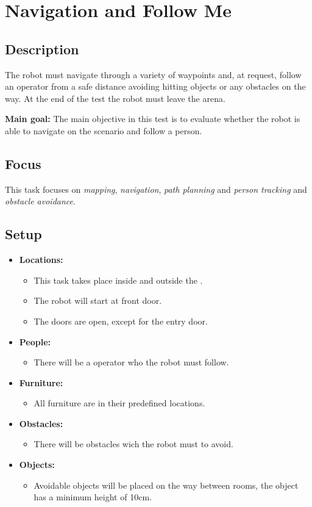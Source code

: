 \section{Navigation and Follow Me}
\label{test:navigation-and-follow-me}

\subsection*{Description}
The robot must navigate through a variety of waypoints and, at request, follow an operator from a safe distance avoiding hitting objects or any obstacles on the way. At the end of the test the robot must leave the arena.

\noindent \textbf{Main goal:}
The main objective in this test is to evaluate whether the robot is able to navigate on the scenario and follow a person.



\subsection*{Focus}
This task focuses on \textit{mapping}, \textit{navigation}, \textit{path planning} and \textit{person tracking} and \textit{obstacle avoidance}.

\subsection*{Setup}
\begin{itemize}[nosep]	
	\item \textbf{Locations:} 
	\begin{itemize}
		\item This task takes place inside and outside the \Arena{}.
		\item The robot will start at front door.
		\item The doors are open, except for the entry door.
	\end{itemize}	 
	\item \textbf{People:} 
	\begin{itemize}
		\item There will be a operator who the robot must follow.
	\end{itemize}
	\item \textbf{Furniture:} 
	\begin{itemize}
		\item All furniture are in their predefined locations.
	\end{itemize}
	\item \textbf{Obstacles:} 
	\begin{itemize}
		\item There will be obstacles wich the robot must to avoid.
	\end{itemize}
    \item \textbf{Objects:} 
    \begin{itemize}
		\item Avoidable objects will be placed on the way between rooms, the object has a minimum height of 10cm.
	\end{itemize}
\end{itemize}

